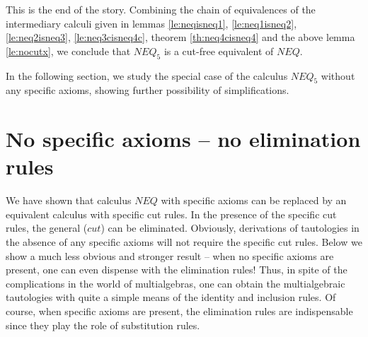 This is the end of the story. Combining the chain of equivalences of the
intermediary calculi given in lemmas \ref{le:neqisneq1}, \ref{le:neq1isneq2},
\ref{le:neq2isneq3}, \ref{le:neq3cisneq4c}, theorem \ref{th:neq4cisneq4} and
the above lemma \ref{le:nocutx}, we conclude that $NEQ_5$ is a cut-free
equivalent of $NEQ$.

In the following section, we study the special case of the calculus
$NEQ_5$ without any specific axioms, showing further possibility of
simplifications. 

\section{No specific axioms -- no elimination rules}\label{se:noax}
We have shown that calculus $NEQ$ with specific axioms can be replaced by an
equivalent calculus with specific cut rules.
In the presence of the specific cut rules, the general ($cut$)
can be eliminated. 
Obviously, derivations of tautologies in the absence of any specific axioms
will not require the specific cut rules. Below we show a much less obvious
and stronger result
-- when no specific axioms are present, 
one can even dispense with the elimination rules! Thus, in spite of the
complications in the world of multialgebras, one can
obtain the multialgebraic tautologies with quite a simple means of the identity
and inclusion rules. Of course, when specific axioms are present, the
elimination rules are indispensable since they play the role of substitution rules.

